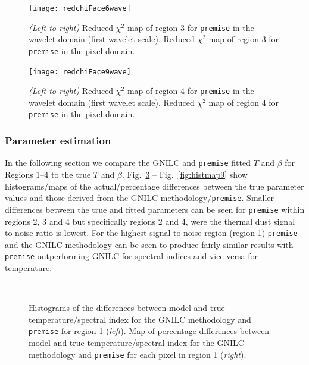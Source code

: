 \documentclass[a4paper,fleqn,usenatbib]{mnras}
\begin{document}
\begin{figure}
\centering
\texttt{[image: redchiFace6wave]}
\caption{{\it{(Left to right)}}  Reduced $\chi^{2}$ map of region 3 for {\texttt{premise}} in the wavelet domain (first wavelet scale). Reduced $\chi^{2}$ map of region 3 for {\texttt{premise}}  in the pixel domain.}
\label{fig:redchi3}
\end{figure}

\begin{figure}
\texttt{[image: redchiFace9wave]}
\caption{{\it{(Left to right)}}  Reduced $\chi^{2}$ map of region 4 for {\texttt{premise}} in the wavelet domain (first wavelet scale). Reduced $\chi^{2}$ map of region 4 for {\texttt{premise}}  in the pixel domain.}
\label{fig:redchi4}
\end{figure}


\subsubsection{Parameter estimation}

In the following section we compare the GNILC and {\texttt{premise}} fitted $T$ and $\beta$ for Regions 1--4 to the true $T$ and $\beta$. Fig.~\ref{fig:histmap1} -- Fig.~\ref{fig:histmap9} show histograms/maps of the actual/percentage differences between the true parameter values and those derived from the GNILC methodology/{\texttt{premise}}. Smaller differences between the true and fitted parameters can be seen for {\texttt{premise}} within regions 2, 3 and 4 but specifically regions 2 and 4, were the thermal dust signal to noise ratio is lowest. For the highest signal to noise region (region 1) {\texttt{premise}} and the GNILC methodology can be seen to produce fairly similar results with {\texttt{premise}} outperforming GNILC for spectral indices and vice-versa for temperature.  

\begin{figure}
\centering
{}\,
\,
\caption{Histograms of the differences between model and true temperature/spectral index for the GNILC methodology and {\texttt{premise}} for region 1 ({\it{left}}). Map of percentage differences between model and true temperature/spectral index for the GNILC methodology and {\texttt{premise}} for each pixel in region 1 ({\it{right}}).}
\label{fig:histmap1}
\end{figure}
\end{document}
